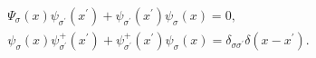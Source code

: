\documentclass[10pt]{article}
\begin{document}
\[

\begin{gathered}

\Psi_{\sigma}(x) \psi_{\sigma^{\prime}}\left(x^{\prime}\right)+\psi_{\sigma^{\prime}}\left(x^{\prime}\right) \psi_{\sigma}(x)=0, \\

\psi_{\sigma}(x) \psi_{\sigma^{\prime}}^{+}\left(x^{\prime}\right)+\psi_{\sigma^{\prime}}^{+}\left(x^{\prime}\right) \psi_{\sigma}(x)=\delta_{\sigma \sigma^{\prime}} \delta\left(x-x^{\prime}\right) .

\end{gathered}

\]
\end{document}
